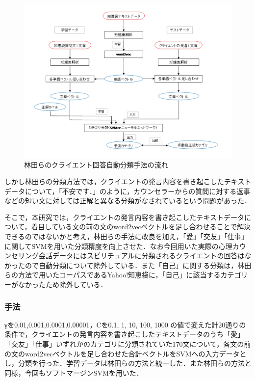 \documentclass[shuuron]{kuee}
\begin{document}
\begin{figure}
  \begin{center}
    \includegraphics[width=\linewidth]{flowHayashida.png}
  \end{center}
  \caption{林田らのクライエント回答自動分類手法の流れ}
  \label{fig:flowHayashida}
\end{figure}

しかし林田らの分類方法では，クライエントの発言内容を書き起こしたテキストデータについて，「不安です．」のように，カウンセラーからの質問に対する返事などの短い文に対しては正解と異なる分類がなされているという問題があった．

そこで，本研究では，クライエントの発言内容を書き起こしたテキストデータについて，着目している文の前の文のword2vecベクトルを足し合わせることで解決できるのではないかと考え，林田らの手法に改良を加え，「愛」「交友」「仕事」に関してSVMを用いた分類精度を向上させた．なお今回用いた実際の心理カウンセリング会話データにはスピリチュアルに分類されるクライエントの回答はなかったので自動分類について除外している．また「自己」に関する分類は，林田らの方法で用いたコーパスであるYahoo!知恵袋に，「自己」に該当するカテゴリーがなかったため除外している．

\subsubsection{手法}
γを0.01,0.001,0.0001,0.00001，Cを0.1, 1, 10, 100, 1000
の値で変えた計20通りの条件で，クライエントの発言内容を書き起こしたテキストデータのうち「愛」「交友」「仕事」いずれかのカテゴリに分類されていた170文について，各文の前の文のword2vecベクトルを足し合わせた合計ベクトルをSVMへの入力データとし，分類を行った．学習データは林田らの方法と統一した．また林田らの方法と同様，今回もソフトマージンSVMを用いた．%
\end{document}
